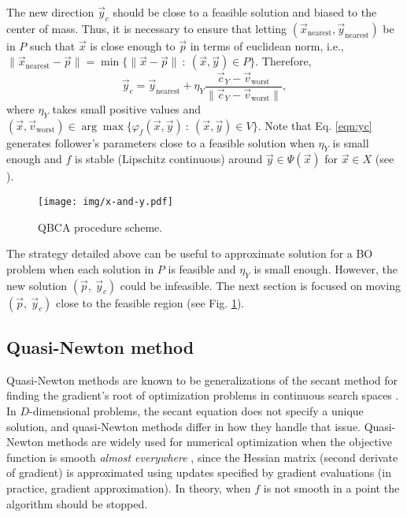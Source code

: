 \documentclass[conference]{IEEEtran}
\theoremstyle{definition}
\begin{document}
% 
The new direction $\vec{y}_c$ should be close to a feasible solution and biased
to the center of mass. Thus, it is necessary to ensure that letting
$(\vec{x}_\text{nearest}, \vec{y}_{\text{nearest}}) $ be in $P$ such that $\vec{x}$
is close enough to $\vec{p}$ in terms of euclidean norm, i.e.,
$ \| \vec{x}_{\text{nearest}} - \vec{p} \| = \min\{ \| \vec{x} - \vec{p} \| \ : \ (\vec{x}, \vec{y}) \in P  \} $.
Therefore,
% 
\begin{equation}
    \vec{y}_c = \vec{y}_{\text{nearest}} + \eta_{Y} \dfrac{\vec{c}_Y - \vec{v}_{\text{worst}}}{\| \vec{c}_Y - \vec{v}_{\text{worst}} \|},
    \label{eqn:yc}
\end{equation} %
% 
where $\eta_Y$ takes small positive values and 
% 
$
    (\vec{x}, \vec{v}_{\text{worst}}) \in \arg \max \{\varphi_f(\vec{x}, \vec{y} )  \ : \ (\vec{x}, \vec{y}) \in V \}
$. Note that Eq. \ref{eqn:yc} generates follower's parameters close to a feasible
solution when $\eta_{Y}$ is small enough and $f$ is stable (Lipschitz continuous)
around $\vec{y} \in \Psi(\vec{x}) $ for  $\vec{x} \in X$ (see \cite{dempe2002foundations}). %
% 

% 
\begin{figure}[t]
    \centering
    \texttt{[image: img/x-and-y.pdf]}
    \caption{QBCA procedure scheme.}
    \label{fig:qca}
\end{figure}
% 
The strategy detailed above can be useful to approximate solution for a BO problem
when each solution in  $P$ is feasible and $\eta_{Y}$ is small enough. However,
the new solution $(\vec{p},\ \vec{y}_c)$ could be infeasible. The next section
is focused on moving $(\vec{p},\ \vec{y}_c)$ close to the feasible region
(see Fig. \ref{fig:qca}).


\subsection{Quasi-Newton method} %
\label{sub:nonsmooth_optimization_via_bfgs}

Quasi-Newton methods are known to be generalizations of the secant method for
finding the gradient's root of optimization problems in continuous search spaces \cite{fletcher2013practical,liu1989limited}.
In $D$-dimensional problems, the secant equation does not specify a unique solution,
and quasi-Newton methods differ in how they handle that issue. Quasi-Newton methods
are widely used for numerical optimization when the objective function is smooth
\textit{almost everywhere} \cite{lewis2013nonsmooth}, since the Hessian matrix
(second derivate of gradient) is approximated using updates specified by gradient
evaluations (in practice, gradient approximation). In theory, when $f$ is not
smooth in a point the algorithm should be stopped. 
\end{document}

